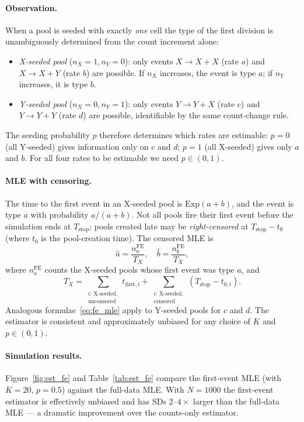 \documentclass[12pt]{article}
\begin{document}
\paragraph{Observation.}
When a pool is seeded with exactly \emph{one} cell the type of the first
division is unambiguously determined from the count increment alone:
\begin{itemize}
  \item \emph{X-seeded pool} ($n_X=1, n_Y=0$): only events
        $X\!\to\!X{+}X$ (rate $a$) and $X\!\to\!X{+}Y$ (rate $b$) are
        possible.  If $n_X$ increases, the event is type $a$; if $n_Y$
        increases, it is type $b$.
  \item \emph{Y-seeded pool} ($n_X=0, n_Y=1$): only events
        $Y\!\to\!Y{+}X$ (rate $c$) and $Y\!\to\!Y{+}Y$ (rate $d$) are
        possible, identifiable by the same count-change rule.
\end{itemize}
The seeding probability $p$ therefore determines which rates are
estimable: $p=0$ (all Y-seeded) gives information only on $c$ and $d$;
$p=1$ (all X-seeded) gives only $a$ and $b$.  For all four rates to be
estimable we need $p \in (0,1)$.

\paragraph{MLE with censoring.}
The time to the first event in an X-seeded pool is $\mathrm{Exp}(a+b)$,
and the event is type $a$ with probability $a/(a+b)$.  Not all pools
fire their first event before the simulation ends at $T_{\mathrm{stop}}$;
pools created late may be \emph{right-censored} at $T_{\mathrm{stop}} -
t_0$ (where $t_0$ is the pool-creation time).  The censored MLE is
\begin{equation}
  \hat{a} = \frac{n_a^{\mathrm{FE}}}{T_X}, \quad
  \hat{b} = \frac{n_b^{\mathrm{FE}}}{T_X},
  \label{eq:fe_mle}
\end{equation}
where $n_a^{\mathrm{FE}}$ counts the X-seeded pools whose first event
was type $a$, and
\[
  T_X = \sum_{\substack{i:\,\text{X-seeded},\\ \text{uncensored}}} t_{\mathrm{first},i}
      + \sum_{\substack{i:\,\text{X-seeded},\\ \text{censored}}} (T_{\mathrm{stop}} - t_{0,i}).
\]
Analogous formulae~\eqref{eq:fe_mle} apply to Y-seeded pools for $c$ and
$d$.  The estimator is consistent and approximately unbiased for any
choice of $K$ and $p \in (0,1)$.

\paragraph{Simulation results.}
Figure~\ref{fig:est_fe} and Table~\ref{tab:est_fe} compare the
first-event MLE (with $K = 20$, $p = 0.5$) against the full-data MLE.
With $N = 1000$ the first-event estimator is effectively unbiased and
has SDs $2$--$4\times$ larger than the full-data MLE — a dramatic
improvement over the counts-only estimator.
\end{document}
